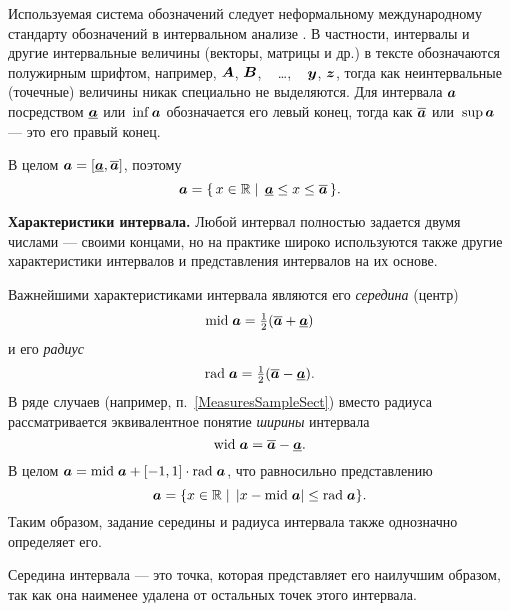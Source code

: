 \documentclass[a5paper,openany]{book}
\newcommand{\mbf}[1]{\protect\text{\boldmath$#1$}}
\newcommand{\mbb}{\mathbb}
\newcommand{\ov}{\overline}
\newcommand{\un}{\underline}
\newcommand{\m}{\mathrm{mid}\;}
\newcommand{\w}{\mathrm{wid}\;}
\renewcommand{\r}{\mathrm{rad}\;}
\begin{document}
{Используемая система обозначений следует неформальному международному стандарту обозначений в интервальном анализе \cite{InteNotation}. 
В частности, интервалы и другие интервальные величины (векторы, матрицы и др.) 
в тексте обозначаются полужирным шрифтом, например, $\mbf{A}$, $\mbf{B}$, 
~ \ldots, ~ $\mbf{y}$, $\mbf{z}$, тогда как неинтервальные 
(точечные) величины никак специально не выделяются. Для интервала $\mbf{a}$ 
посредством $\un{\mbf{a}}$ или $\,\inf\mbf{a}$ обозначается его левый конец, тогда 
как $\ov{\mbf{a}}$ или $\,\sup\mbf{a}$ --- это его правый конец. 

В целом $\mbf{a} = [\un{\mbf{a}}, \ov{\mbf{a}}]$, поэтому
\begin{equation}
	\label{LowUpRepres}
	\mbf{a} = \{\,x\in\mbb{R} \mid \,\un{\mbf{a}}\leq x\leq \ov{\mbf{a}}\,\}.
\end{equation} 

{\bf Характеристики интервала.} \label{InrevalProp}
Любой интервал полностью задается двумя числами --- своими концами, но на практике 
широко используются также другие характеристики интервалов и представления интервалов 
на их основе. 

Важнейшими характеристиками интервала являются его \emph{середина} (центр) 
\begin{equation}\label{midint}
	\textstyle\index{середина интервала} 
	\m\mbf{a} = \frac{1}{2}(\ov{\mbf{a}} + \un{\mbf{a}})
\end{equation}
и его \emph{радиус} 
\begin{equation}\label{radint} 	\textstyle\index{радиус интервала}
	\r\mbf{a} = \frac{1}{2}(\ov{\mbf{a}} - \un{\mbf{a}}).
\end{equation} 
В ряде случаев (например, п.~\ref{MeasuresSampleSect}) вместо радиуса рассматривается эквивалентное понятие \emph{ширины} 
интервала   
\begin{equation}\label{widint}
	\w\mbf{a} = \ov{\mbf{a}} - \un{\mbf{a}}. 
\end{equation}
В целом $\mbf{a} = \m\mbf{a} + [-1, 1]\cdot\r\mbf{a}$, что равносильно представлению 
\begin{equation}
	\label{MidRadRepres}
	\mbf{a} = \{x\in\mbb{R} \mid \,|x-\m\mbf{a}|\leq \r\mbf{a}\}.
\end{equation} 
Таким образом, задание середины и радиуса интервала также однозначно определяет его.

Середина интервала --- это точка, которая представляет его наилучшим образом, 
так как она наименее удалена от остальных точек этого интервала. 

}
\end{document}
